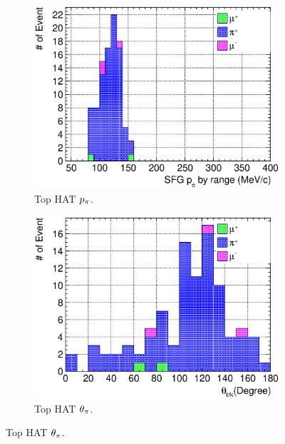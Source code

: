           \begin{figure}[ht]
               \centering
               \begin{subfigure}{\dbfigwid\textwidth}
                    \includegraphics[width=\textwidth]{figures/sel/sspi_TOP_pi_mombr_stack_al6_zoom.eps}
                    \caption{Top HAT $p_{\pi}$.}
                    \label{subfig:sppi-top-ppi}
               \end{subfigure}
               \begin{subfigure}{\dbfigwid\textwidth}
                    \includegraphics[width=\textwidth]{figures/sel/sspi_TOP_theta_trk_stack_al6_zoom.eps}
                    \caption{Top HAT $\theta_{\pi}$.}
                    \label{subfig:sppi-top-tpi}

\end{subfigure}
\end{figure}
